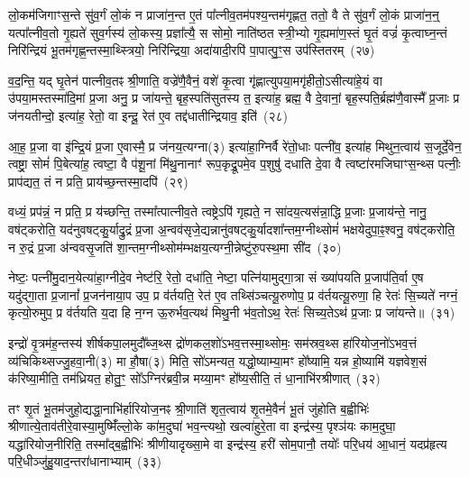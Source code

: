 लो॒कम॑जिगाꣳस॒न्ते सु॑व॒र्गं लो॒कं न प्राजा॑न॒न्त ए॒तं पा᳚त्नीव॒तम॑पश्य॒न्तम॑गृह्णत॒ ततो॒ वै ते सु॑व॒र्गं लो॒कं प्राजा॑न॒न्॒ यत्पा᳚त्नीव॒तो गृ॒ह्यते॑ सुव॒र्गस्य॑ लो॒कस्य॒ प्रज्ञा᳚त्यै॒ स सोमो॒ नाति॑ष्ठत स्त्री॒भ्यो गृ॒ह्यमा॑ण॒स्तं घृ॒तं वज्रं॑ कृ॒त्वाघ्न॒न्तं निरि॑न्द्रियं भू॒तम॑गृह्ण॒न्तस्मा॒थ्स्त्रियो॒ निरि॑न्द्रिया॒ अदा॑यादी॒रपि॑ पा॒पात्पु॒ꣳ॒स उप॑स्तितरम्~(२७)\ip

व॒द॒न्ति॒ यद् घृ॒तेन॑ पात्नीव॒तꣴ श्री॒णाति॒ वज्रे॑णै॒वैनं॒ वशे॑ कृ॒त्वा गृ॑ह्णात्युपया॒मगृ॑हीतो॒\-ऽसीत्या॑हे॒यं वा उ॑पया॒मस्तस्मा॑दि॒मां प्र॒जा अनु॒ प्र जा॑यन्ते॒ बृह॒स्पति॑सुतस्य त॒ इत्या॑ह॒ ब्रह्म॒ वै दे॒वानां॒ बृह॒स्पति॒र्ब्रह्म॑णै॒वास्मै᳚ प्र॒जाः प्र ज॑नयतीन्दो॒ इत्या॑ह॒ रेतो॒ वा इन्दू॒ रेत॑ ए॒व तद्द॑धातीन्द्रियाव॒ इति॑~(२८)\ip

आ॒ह॒ प्र॒जा वा इ॑न्द्रि॒यं प्र॒जा ए॒वास्मै॒ प्र ज॑नय॒त्यग्ना(३) इत्या॑हा॒ग्निर्वै रे॑तो॒धाः पत्नी॑व॒ इत्या॑ह मिथुन॒त्वाय॑ स॒जूर्दे॒वेन॒ त्वष्ट्रा॒ सोमं॑ पि॒बेत्या॑ह॒ त्वष्टा॒ वै प॑शू॒नां मि॑थु॒नानाꣳ॑ रूप॒कृद्रू॒पमे॒व प॒शुषु॑ दधाति दे॒वा वै त्वष्टा॑रमजिघाꣳस॒न्थ्स पत्नीः॒ प्राप॑द्यत॒ तं न प्रति॒ प्राय॑च्छ॒न्तस्मा॒दपि॑~(२९)\ip

वध्यं॒ प्रप॑न्नं॒ न प्रति॒ प्र य॑च्छन्ति॒ तस्मा᳚त्पात्नीव॒ते त्वष्ट्रे\-ऽपि॑ गृह्यते॒ न सा॑दय॒त्यस॑न्ना॒द्धि प्र॒जाः प्र॒जाय॑न्ते॒ नानु॒ वष॑ट्करोति॒ यद॑नुवषट्कु॒र्याद्रु॒द्रं प्र॒जा अ॒न्वव॑सृजे॒द्यन्नानु॑वषट्कु॒र्यादशा᳚न्तम॒ग्नीथ्सोमं॑ भक्षयेदुपा॒ꣴ॒श्वनु॒ वष॑ट्करोति॒ न रु॒द्रं प्र॒जा अ॑न्ववसृ॒जति॑ शा॒न्तम॒ग्नीथ्सोम॑म्भक्षय॒त्यग्नी॒न्नेष्टु॑रु॒पस्थ॒मा सी॑द~(३०)\ip

नेष्टः॒ पत्नी॑मु॒दान॒येत्या॑हा॒ग्नीदे॒व नेष्ट॑रि॒ रेतो॒ दधा॑ति॒ नेष्टा॒ पत्नि॑यामुद्गा॒त्रा सं ख्या॑पयति प्र॒जा\-प॑ति॒र्वा ए॒ष यदु॑द्गा॒ता प्र॒जानां᳚ प्र॒जन॑नाया॒प उप॒ प्र व॑र्तयति॒ रेत॑ ए॒व तथ्सि॑ञ्चत्यू॒रुणोप॒ प्र व॑र्तयत्यू॒रुणा॒ हि रेतः॑ सि॒च्यते॑ नग्नं॒ कृत्यो॒रुमुप॒ प्र व॑र्तयति य॒दा हि न॒ग्न ऊ॒रुर्भव॒त्यथ॑ मिथु॒नी भ॑व॒तो\-ऽथ॒ रेतः॑ सिच्य॒ते\-ऽथ॑ प्र॒जाः प्र जा॑यन्ते॥~(३१)\ip

{\anuvakamend[{पत्नीः᳚ सुव॒र्गमुप॑स्तितरमिन्द्रियाव॒ इत्यपि॑ सीद मिथु॒न्य॑ष्टौ च॑}]}

इन्द्रो॑ वृ॒त्रम॑ह॒न्तस्य॑ शीर्\mbox{}षकपा॒लमुदौ᳚ब्ज॒थ्स द्रो॑णकल॒शो॑\-ऽभव॒त्तस्मा॒थ्सोमः॒ सम॑स्रव॒थ्स हा॑रियोज॒नो॑\-ऽभव॒त्तं व्य॑चिकिथ्सज्जु॒हवा॒नी(३) मा हौ॒षा(३) मिति॒ सो॑\-ऽमन्यत॒ यद्धो॒ष्याम्या॒मꣳ हो᳚ष्यामि॒ यन्न हो॒ष्यामि॑ यज्ञवेश॒सं क॑रिष्या॒मीति॒ तम॑ध्रियत॒ होतु॒ꣳ॒ सो᳚\-ऽग्निर॑ब्रवी॒न्न मय्या॒मꣳ हो᳚ष्य॒सीति॒ तं धा॒नाभि॑रश्रीणात्~(३२)\ip

तꣳ शृ॒तं भू॒तम॑जुहो॒द्यद्धा॒नाभि॑र्\mbox{}हारियोज॒नꣴ श्री॒णाति॑ शृत॒त्वाय॑ शृ॒तमे॒वैनं॑ भू॒तं जु॑होति ब॒ह्वीभिः॑ श्रीणात्ये॒ताव॑ती\-रे॒वास्या॒मुष्मिँ॑ल्लो॒के का॑म॒दुघा॑ भव॒न्त्यथो॒ खल्वा॑हुरे॒ता वा इन्द्र॑स्य॒ पृश्ञ॑यः काम॒दुघा॒ यद्धा॑रियोज॒नीरिति॒ तस्मा᳚द्\-ब॒ह्वीभिः॑ श्रीणीयादृख्सा॒मे वा इन्द्र॑स्य॒ हरी॑ सोम॒पानौ॒ तयोः᳚ परि॒धय॑ आ॒धानं॒ यदप्र॑हृत्य परि॒धीञ्जु॑हु॒याद॒न्तरा॑धानाभ्याम्~(३३)\ip

